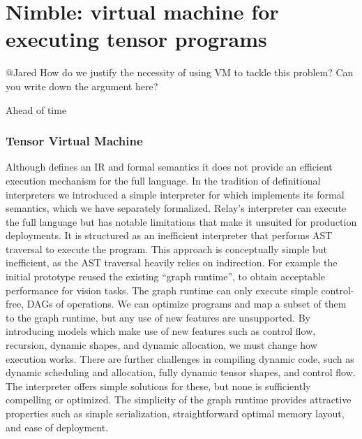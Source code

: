 \chapter{Nimble: virtual machine for executing tensor programs}
\label{ch:nimble}
@Jared How do we justify the necessity of using VM to tackle this problem? Can you write down the argument here?

Ahead of time

\subsection{Tensor Virtual Machine}

Although \relay defines an IR and formal semantics
  it does not provide an efficient execution mechanism for the full language.
In the tradition of definitional interpreters we introduced
  a simple interpreter for \relay which implements its formal semantics, which
  we have separately formalized.
Relay’s interpreter can execute the full language but has notable limitations
  that make it unsuited for production deployments.
It is structured as an inefficient interpreter that performs AST traversal to execute the program.
This approach is conceptually simple but inefficient, as the AST traversal heavily relies on indirection.
For example the initial \relay prototype reused the existing ``graph runtime'', to obtain
  acceptable performance for vision tasks.
The graph runtime can only execute simple control-free,
  DAGs of operations.
We can optimize \relay programs and map a subset of them
  to the graph runtime, but any use of new \relay features
  are unsupported.
By introducing models which make use of new features such
  as control flow, recursion, dynamic shapes, and dynamic allocation,
  we must change how execution works.
There are further challenges in compiling dynamic code, such as dynamic scheduling and allocation,
  fully dynamic tensor shapes, and control flow.
The interpreter offers simple solutions for these, but none is sufficiently compelling or optimized.
The simplicity of the graph runtime provides attractive
  properties such as simple serialization, straightforward
  optimal memory layout, and ease of deployment.

